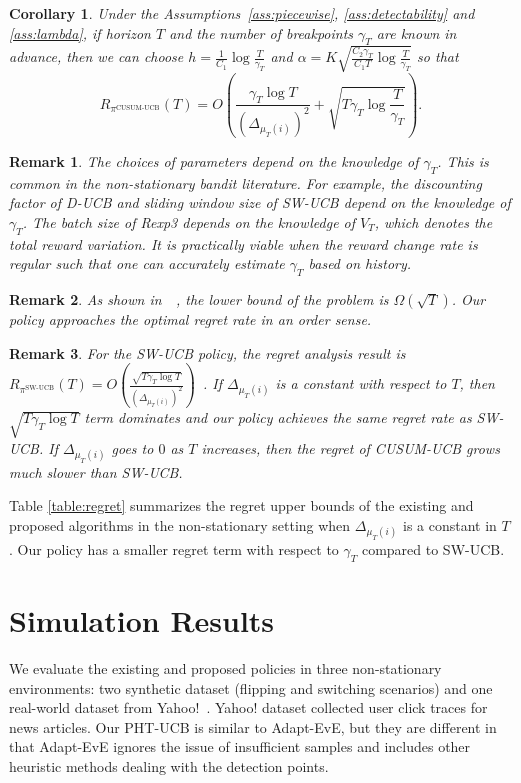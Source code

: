 \documentclass[letterpaper]{article}
\newtheorem{corollary}{Corollary}
\newtheorem{remark}{Remark}
\newcommand{\blue}{}
\newcommand{\green}{}
\begin{document}
\begin{corollary}\label{cor:regret}
Under the Assumptions~\ref{ass:piecewise}, \ref{ass:detectability} and \ref{ass:lambda},
if horizon $T$ and the number of breakpoints $\gamma_T$ are known in advance, then we can choose $h=\frac{1}{C_1}\log \frac{T}{\gamma_T}$ and $\alpha=K\sqrt{\frac{C_2\gamma_T}{C_1T}\log\frac{T}{\gamma_T}}$ so that
\begin{equation}
R_{\pi^{\text{CUSUM-UCB}}}(T)=O\left(\frac{\gamma_T\log T}{(\Delta_{\mu_T(i)})^2}+\sqrt{T\gamma_T\log\frac{T}{\gamma_T}}\right).
\end{equation}
\end{corollary}
{\green
\begin{remark}
The choices of parameters depend on the knowledge of $\gamma_T$. This is common in the non-stationary bandit literature. For example, the discounting factor of D-UCB and sliding window size of SW-UCB depend on the knowledge of $\gamma_T$. The batch size of Rexp3 depends on the knowledge of $V_T$, which denotes the total reward variation. It is practically viable when the reward change rate is regular such that one can accurately estimate $\gamma_T$ based on history.
\end{remark}
}
\begin{remark}
As shown in~\citeauthor{garivier2008upper}~, the lower bound of the problem
is $\Omega(\sqrt{T})$. Our policy approaches the optimal regret rate
in an order sense.
\end{remark}
\begin{remark}\label{rmk:delta}
For the SW-UCB policy, the regret analysis result is $R_{\pi^{\text{SW-UCB}}}(T)=O\left(\frac{\sqrt{T\gamma_T\log T}}{(\Delta_{\mu_T(i)})^2}\right)$~\cite{garivier2008upper}. If $\Delta_{\mu_T(i)}$ is a constant with respect to $T$, then $\sqrt{T\gamma_T\log T}$ term dominates and our policy achieves the same regret rate as SW-UCB. If $\Delta_{\mu_T(i)}$ goes to $0$ as $T$ increases, then the regret of CUSUM-UCB grows much slower than SW-UCB.
\end{remark}

Table \ref{table:regret} summarizes the regret upper bounds
of the existing and proposed algorithms in the non-stationary setting
when $\Delta_{\mu_T(i)}$ is a constant in $T$. Our policy has a smaller regret term with respect to $\gamma_T$ compared to SW-UCB.

\section{Simulation Results}\label{sec:simul}
We evaluate the
{\blue existing and proposed policies
in three non-stationary environments:
two synthetic dataset (flipping and switching scenarios) and one
real-world dataset from Yahoo!~\cite{YahooWebScope}.
Yahoo! dataset collected user click traces for news articles.}
Our PHT-UCB is similar to Adapt-EvE, but they are different in that Adapt-EvE ignores the issue of insufficient samples and includes other {\blue heuristic} methods dealing with the detection points.
\end{document}
